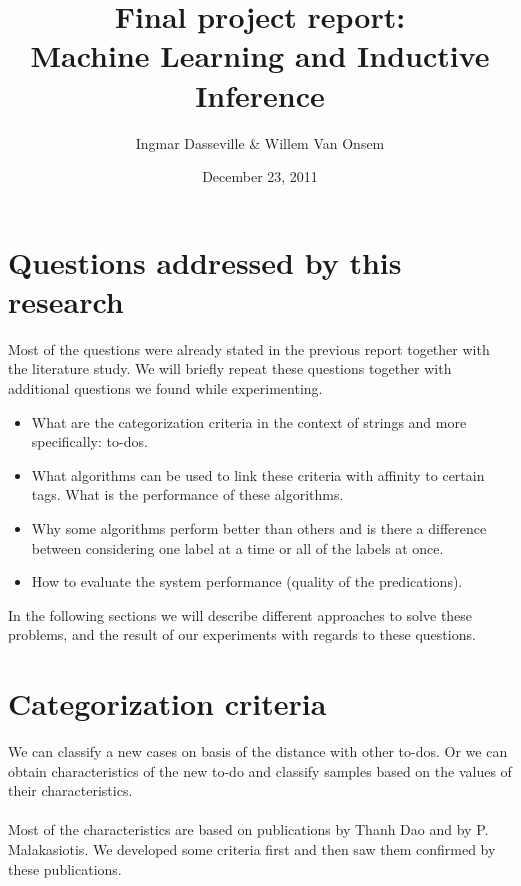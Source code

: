 \documentclass[a4paper,titlepage]{article}
\title{Final project report:\\Machine Learning and Inductive Inference}
\author{Ingmar Dasseville \& Willem Van Onsem}
\date{December 23, 2011}
\begin{document}
\begin{titlepage}
\maketitle
\end{titlepage}
\tableofcontents
\newpage
\section{Questions addressed by this research}
Most of the questions were already stated in the previous report together with the literature study. We will briefly repeat these questions together with additional questions we found while experimenting.
\begin{itemize}
 \item What are the categorization criteria in the context of strings and more specifically: to-dos.
 \item What algorithms can be used to link these criteria with affinity to certain tags. What is the performance of these algorithms.
 \item Why some algorithms perform better than others and is there a difference between considering one label at a time or all of the labels at once.
 \item How to evaluate the system performance (quality of the predications).
\end{itemize}
In the following sections we will describe different approaches to solve these problems, and the result of our experiments with regards to these questions.
\section{Categorization criteria}
We can classify a new cases on basis of the distance with other to-dos. Or we can obtain characteristics of the new to-do and classify samples based on the values of their characteristics.
\paragraph{}
Most of the characteristics are based on publications \cite{codeproject2,codeproject1} by Thanh Dao and \cite{Malakasiotis:2007:LTE:1654536.1654547} by P. Malakasiotis. We developed some criteria first and then saw them confirmed by these publications.
\end{document}
